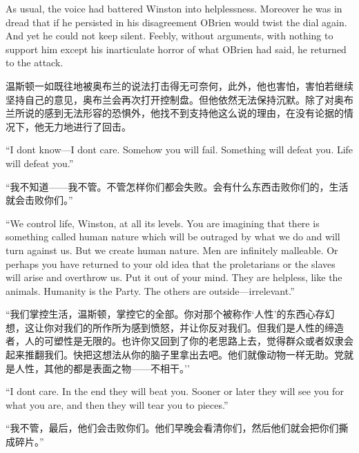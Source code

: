 \begin{paracol}{2}
\switchcolumn*

As usual, the voice had battered Winston into helplessness. Moreover he
was in dread that if he persisted in his disagreement
O\textquotesingle Brien would twist the dial again. And yet he could not
keep silent. Feebly, without arguments, with nothing to support him
except his inarticulate horror of what O\textquotesingle Brien had said,
he returned to the attack.

\switchcolumn

温斯顿一如既往地被奥布兰的说法打击得无可奈何，此外，他也害怕，害怕若继续坚持自己的意见，奥布兰会再次打开控制盘。但他依然无法保持沉默。除了对奥布兰所说的感到无法形容的恐惧外，他找不到支持他这么说的理由，在没有论据的情况下，他无力地进行了回击。

\switchcolumn*

``I don\textquotesingle t know---I don\textquotesingle t care. Somehow
you will fail. Something will defeat you. Life will defeat you.''

\switchcolumn

``我不知道——我不管。不管怎样你们都会失败。会有什么东西击败你们的，生活就会击败你们。''

\switchcolumn*

``We control life, Winston, at all its levels. You are imagining that
there is something called human nature which will be outraged by what we
do and will turn against us. But we create human nature. Men are
infinitely malleable. Or perhaps you have returned to your old idea that
the proletarians or the slaves will arise and overthrow us. Put it out
of your mind. They are helpless, like the animals. Humanity is the
Party. The others are outside---irrelevant.''

\switchcolumn

``我们掌控生活，温斯顿，掌控它的全部。你对那个被称作`人性'的东西心存幻想，这让你对我们的所作所为感到愤怒，并让你反对我们。但我们是人性的缔造者，人的可塑性是无限的。也许你又回到了你的老思路上去，觉得群众或者奴隶会起来推翻我们。快把这想法从你的脑子里拿出去吧。他们就像动物一样无助。党就是人性，其他的都是表面之物——不相干。''

\switchcolumn*

``I don\textquotesingle t care. In the end they will beat you. Sooner or
later they will see you for what you are, and then they will tear you to
pieces.''

\switchcolumn

``我不管，最后，他们会击败你们。他们早晚会看清你们，然后他们就会把你们撕成碎片。''


\end{paracol}
